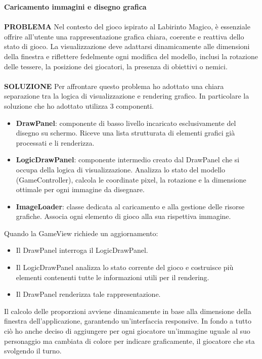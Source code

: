 \documentclass[a4paper,12pt]{report}
\begin{document}
\newpage
\textbf{Caricamento immagini e disegno grafica}
\\
\\
\textbf{PROBLEMA}
Nel contesto del gioco ispirato al Labirinto Magico, è essenziale offrire all’utente una rappresentazione grafica chiara, coerente e reattiva dello stato di gioco. 
La visualizzazione deve adattarsi dinamicamente alle dimensioni della finestra e 
riflettere fedelmente ogni modifica del modello, inclusi la rotazione delle tessere, la posizione dei giocatori, la presenza di obiettivi o nemici.
\\
\\
\textbf{SOLUZIONE}
Per affrontare questo problema ho adottato una chiara separazione tra la logica di visualizzazione e rendering grafico.
In particolare la soluzione che ho adottato utilizza 3 componenti.
\begin{itemize}
	\item \textbf{DrawPanel}: componente di basso livello incaricato esclusivamente del disegno su schermo. Riceve una lista strutturata di elementi grafici già processati e li renderizza.
	\item \textbf{LogicDrawPanel}: componente intermedio creato dal DrawPanel che si occupa della logica di visualizzazione. 
	Analizza lo stato del modello (GameController), calcola le coordinate pixel, la rotazione e la dimensione ottimale per ogni immagine da disegnare.
	\item \textbf{ImageLoader}:  classe dedicata al caricamento e alla gestione delle risorse grafiche. Associa ogni elemento di gioco alla sua rispettiva immagine.
\end{itemize}
Quando la GameView richiede un aggiornamento:
\begin{itemize}
	\item Il DrawPanel interroga il LogicDrawPanel.
	\item Il LogicDrawPanel analizza lo stato corrente del gioco e costruisce più elementi contenenti tutte le informazioni utili per il rendering.
	\item Il DrawPanel renderizza tale rappresentazione.
\end{itemize}
Il calcolo delle proporzioni avviene dinamicamente in base alla dimensione della finestra dell’applicazione, garantendo un’interfaccia responsive. 
In fondo a tutto ciò ho anche deciso di aggiungere per ogni giocatore un'immagine uguale al suo personaggio ma cambiata di colore per indicare graficamente, 
il giocatore che sta svolgendo il turno.
\\
\end{document}

